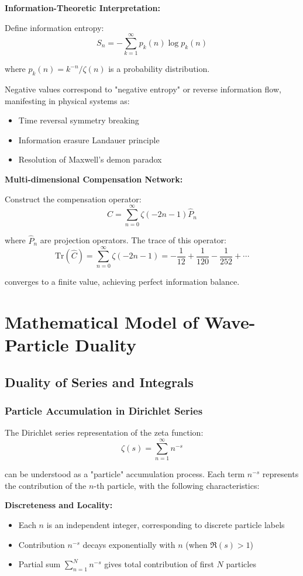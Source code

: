 \documentclass[11pt]{article}
\theoremstyle{plain}
\theoremstyle{definition}
\theoremstyle{remark}
\begin{document}
\textbf{Information-Theoretic Interpretation:}

Define information entropy:
$$S_n = -\sum_{k=1}^{\infty} p_k(n) \log p_k(n)$$

where $p_k(n) = k^{-n}/\zeta(n)$ is a probability distribution.

Negative values correspond to "negative entropy" or reverse information flow, manifesting in physical systems as:
\begin{itemize}
\item Time reversal symmetry breaking
\item Information erasure Landauer principle
\item Resolution of Maxwell's demon paradox
\end{itemize}

\textbf{Multi-dimensional Compensation Network:}

Construct the compensation operator:
$$\hat{C} = \sum_{n=0}^{\infty} \zeta(-2n-1) \hat{P}_n$$

where $\hat{P}_n$ are projection operators. The trace of this operator:
$$\text{Tr}(\hat{C}) = \sum_{n=0}^{\infty} \zeta(-2n-1) = -\frac{1}{12} + \frac{1}{120} - \frac{1}{252} + \cdots$$

converges to a finite value, achieving perfect information balance.

\section{Mathematical Model of Wave-Particle Duality}

\subsection{Duality of Series and Integrals}

\subsubsection{Particle Accumulation in Dirichlet Series}

The Dirichlet series representation of the zeta function:
$$\zeta(s) = \sum_{n=1}^{\infty} n^{-s}$$

can be understood as a "particle" accumulation process. Each term $n^{-s}$ represents the contribution of the $n$-th particle, with the following characteristics:

\textbf{Discreteness and Locality:}
\begin{itemize}
\item Each $n$ is an independent integer, corresponding to discrete particle labels
\item Contribution $n^{-s}$ decays exponentially with $n$ (when $\Re(s) > 1$)
\item Partial sum $\sum_{n=1}^N n^{-s}$ gives total contribution of first $N$ particles
\end{itemize}
\end{document}
